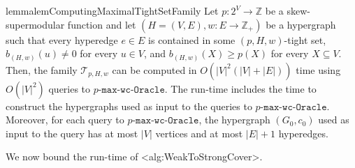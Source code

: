 \documentclass{article}
\def\Cref#1{<#1>}%
\newcommand{\functionMaximizationOracle}[1]{\ensuremath{{#1}\text{-}\mathtt{max}\text{-}\mathtt{wc}\text{-}\mathtt{Oracle}}\xspace}
\newcommand{\maximalTightSetFamily}[1]{\ensuremath{\calT_{#1}}\xspace}
\providecommand{\Z}{\mathbb{Z}}
\providecommand{\calT}{\mathcal{T}}
\begin{document}
\begin{restatable}{lemma}{lemComputingMaximalTightSetFamily}\label{lem:FunctionMaximizetionOracles:computing-maximal-pHw-tight-sets-with-p-max-oracle}
 Let $p:2^V\rightarrow\Z$ be a skew-supermodular function and let $\left(H = (V, E), w:E \rightarrow\Z_+\right)$ be a hypergraph such that every hyperedge $e \in E$ is contained in some $(p, H, w)$-tight set, $b_{(H,w)}(u) \not = 0$ for every $u \in V$, and $b_{(H,w)}(X) \geq p(X)$ for every $X \subseteq V$.
Then, the family $\maximalTightSetFamily{p, H, w}$ can be computed in $O(|V|^2(|V|+|E|))$ time using $O(|V|^2)$ queries to \functionMaximizationOracle{p}. The run-time includes the time to construct the hypergraphs used as input to the queries to \functionMaximizationOracle{p}. Moreover, for each query to \functionMaximizationOracle{p}, the hypergraph $(G_0, c_0)$ used as input to the query has at most $|V|$ vertices and at most $|E| + 1$ hyperedges.  \end{restatable}

We now bound the run-time of \Cref{alg:WeakToStrongCover}. 
\end{document}
